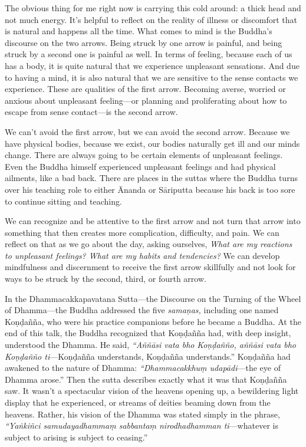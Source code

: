 
The obvious thing for me right now is carrying this cold around: a 
thick head and not much energy. It's helpful to reflect on the reality 
of illness or discomfort that is natural and happens all the time. What 
comes to mind is the Buddha's discourse on the two arrows. Being struck 
by one arrow is painful, and being struck by a second one is painful as 
well. In terms of feeling, because each of us has a body, it is quite 
natural that we experience unpleasant sensations. And due to having a 
mind, it is also natural that we are sensitive to the sense contacts we 
experience. These are qualities of the first arrow. Becoming averse, 
worried or anxious about unpleasant feeling---or planning and 
proliferating about how to escape from sense contact---is the second 
arrow.

We can't avoid the first arrow, but we can avoid the second arrow. 
Because we have physical bodies, because we exist, our bodies naturally 
get ill and our minds change. There are always going to be certain 
elements of unpleasant feelings. Even the Buddha himself experienced 
unpleasant feelings and had physical ailments, like a bad back. There 
are places in the suttas where the Buddha turns over his teaching role 
to either Ānanda or Sāriputta because his back is too sore to 
continue sitting and teaching.

We can recognize and be attentive to the first arrow and not turn that 
arrow into something that then creates more complication, difficulty, 
and pain. We can reflect on that as we go about the day, asking 
ourselves, \emph{What are my reactions to unpleasant feelings? What are 
my habits and tendencies?} We can develop mindfulness and discernment 
to receive the first arrow skillfully and not look for ways to be 
struck by the second, third, or fourth arrow.


In the Dhammacakkapavatana Sutta---the Discourse on the Turning of the 
Wheel of Dhamma---the Buddha addressed the five \emph{samaṇas,} 
including one named Koṇḍañña, who were his practice companions 
before he became a Buddha. At the end of this talk, the Buddha 
recognized that Koṇḍañña had, with deep insight, understood the 
Dhamma. He said, \emph{``Aññāsi vata bho} \emph{Koṇḍañño, 
aññāsi vata bho Koṇḍañño ti}---Koṇḍañña understands, 
Koṇḍañña understands.'' Koṇḍañña had awakened to the nature 
of Dhamma: \emph{``Dhammacakkhuṃ udapādi}---the eye of Dhamma 
arose.'' Then the sutta describes exactly what it was that 
Koṇḍañña saw. It wasn't a spectacular vision of the heavens 
opening up, a bewildering light display that he experienced, or streams 
of deities beaming down from the heavens. Rather, his vision of the 
Dhamma was stated simply in the phrase, \emph{``Yaṅkiñci 
samudayadhammaṃ sabbantaṃ nirodhadhamman ti}---whatever is subject 
to arising is subject to ceasing.''

